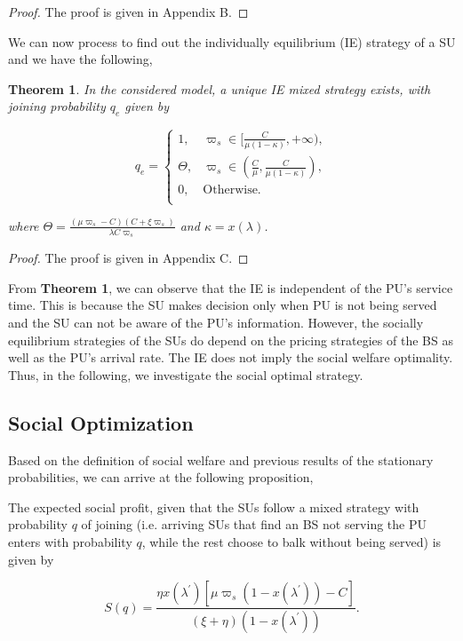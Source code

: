 \documentclass[journal]{IEEEtran}
\begin{document}
\begin{proof}
The proof is given in Appendix B.
\end{proof}

We can now process to find out the individually
equilibrium (IE) strategy of a SU and we have the following,

\theoremstyle{theorem}
\newtheorem{theorem}{Theorem}
\begin{theorem}
In the considered model, a unique IE mixed strategy exists, with
joining probability $q_e$ given by

\begin{equation}
\label{eq:NE}
 q_{e}=
\begin{cases}
1, & \varpi_s \in [\frac{C}{\mu(1-\kappa )},+\infty), \\
\Theta, &\varpi_s \in (\frac{C}{\mu},\frac{C}{\mu(1-\kappa )}),\\
0, &\text{Otherwise.}\\
\end{cases}
\end{equation}

\noindent where $\Theta = \frac{(\mu \varpi_s -C)(C + \xi
\varpi_s)}{\lambda C \varpi_s }$ and $\kappa = x(\lambda)$.

\end{theorem}
\begin{proof}
The proof is given in Appendix C.
\end{proof}

From \textbf{Theorem 1}, we can observe that the IE is independent
of the PU's service time. This is because the SU makes decision
only when PU is not being served and the SU can not be aware of
the PU's information. However, the socially equilibrium strategies
of the SUs do depend on the pricing strategies of the BS as well
as the PU's arrival rate. The IE does not imply the social welfare
optimality. Thus, in the following, we investigate the social
optimal strategy.

\subsection{Social Optimization}

Based on the definition of social welfare and previous results of
the stationary probabilities, we can arrive at the following
proposition,

\begin{proposition}
The expected social profit, given that the SUs follow a mixed
strategy with probability $q$ of joining (i.e. arriving
SUs that find an BS not serving the PU enters with probability $q$,
while the rest choose to balk without being served) is given by

\begin{equation}
\label{eq:ProfitSO} S(q) = \frac{\eta x(\lambda^{'}) [\mu \varpi_s
(1-x(\lambda^{'})) - C]}{(\xi + \eta)(1-x(\lambda^{'}))}.
\end{equation}

\end{proposition}
\end{document}
